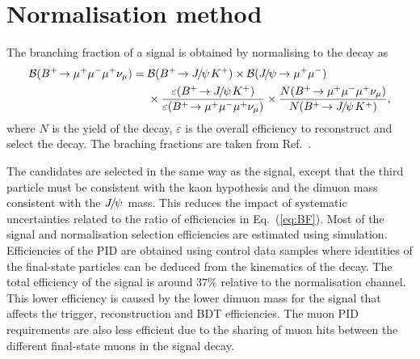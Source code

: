 \section{Normalisation method}
\label{sec:Normalisation}
The branching fraction of a \Bmumumu signal is obtained by normalising to the \bjpsimumuk decay as
\begin{equation}
  \begin{aligned}
    \label{eq:BF}
	\mathcal{B}(\Bmumumu) &=\mathcal{B}(\decay{\Bp}{\jpsi\Kp}) \times
	\mathcal{B}(\decay{\jpsi}{\mup\mun}) \\
	 &\phantom{{}={}} \times
	\frac{\varepsilon(\decay{\Bp}{\jpsi\Kp})}{\varepsilon(\Bmumumu)}
	\times \frac{N(\Bmumumu)}{N(\decay{\Bp}{\jpsi\Kp})},
\end{aligned}
\end{equation}
where $N$ is the yield of the decay, $\varepsilon$ is the overall efficiency
to reconstruct and select the decay. The braching fractions are taken from
Ref.~\cite{PDG2018}.

The \decay{\Bp}{\jpsi\Kp} candidates are selected in the same way as the signal, except that
the third particle must be consistent with the kaon hypothesis and the dimuon mass
consistent with the ${{J\mskip -3mu/\mskip -2mu\psi\mskip 2mu}}$ mass. This reduces the
impact of systematic uncertainties related to the ratio of efficiencies in
Eq.~(\ref{eq:BF}). Most of the signal and normalisation selection efficiencies are
estimated using simulation. Efficiencies of the PID are obtained using control data
samples where identities of the final-state particles can be deduced from the kinematics
of the decay. The total efficiency of the \Bmumumu signal is around $37\%$ relative
to the normalisation channel. This lower efficiency is caused by the lower dimuon
mass for the signal that affects the trigger, reconstruction and BDT efficiencies.
The muon PID requirements are also less efficient due to the sharing of muon hits
between the different final-state muons in the signal decay.


